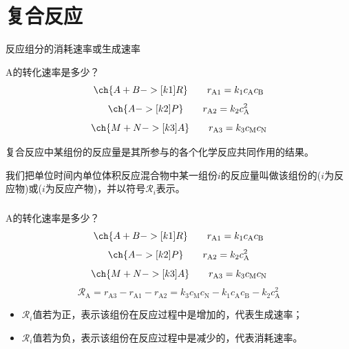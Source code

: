 \section{复合反应}




\begin{frame}{反应组分的消耗速率或生成速率}
	
    \begin{redblock}{A的转化速率是多少？}
        \[
            \ch{A + B ->[k1] R} \qquad r_\mathrm{A1} = k_1 c_\mathrm{A}c_\mathrm{B}
        \]
        \[
            \ch{A ->[k2] P}  \qquad r_\mathrm{A2} = k_2 c_\mathrm{A}^2
        \]
        \[
            \ch{M + N ->[k3] A} \qquad r_\mathrm{A3} = k_3c_\mathrm{M}c_\mathrm{N}
        \]
    \end{redblock}
	
    复合反应中某组份的反应量是其所参与的各个化学反应共同作用的结果。
	
    我们把单位时间内单位体积反应混合物中某一组份$i$的反应量叫做该组份的($i$为反应物)或($i$为反应产物)，并以符号$\mathcal{R}_i$表示。
\end{frame}




\begin{frame}[t]
    \frametitle{}
    \begin{redblock}{A的转化速率是多少？}
        \[
            \ch{A + B ->[k1] R} \qquad r_\mathrm{A1} = k_1 c_\mathrm{A}c_\mathrm{B}
        \]
        \[
            \ch{A ->[k2] P}  \qquad r_\mathrm{A2} = k_2 c_\mathrm{A}^2
        \]
        \[
            \ch{M + N ->[k3] A} \qquad r_\mathrm{A3} = k_3c_\mathrm{M}c_\mathrm{N}
        \]
        \tcblower
        \[
            \mathcal{R}_\mathrm{A} = r_\mathrm{A3} - r_\mathrm{A1} - r_\mathrm{A2} = k_3c_\mathrm{M}c_\mathrm{N} - k_1 c_\mathrm{A}c_\mathrm{B} - k_2 c_\mathrm{A}^2
        \]
    \end{redblock}
    \begin{itemize}
      \item $\mathcal{R}_i$值若为正，表示该组份在反应过程中是增加的，代表生成速率；
      \item $\mathcal{R}_i$值若为负，表示该组份在反应过程中是减少的，代表消耗速率。
    \end{itemize}
\end{frame}


